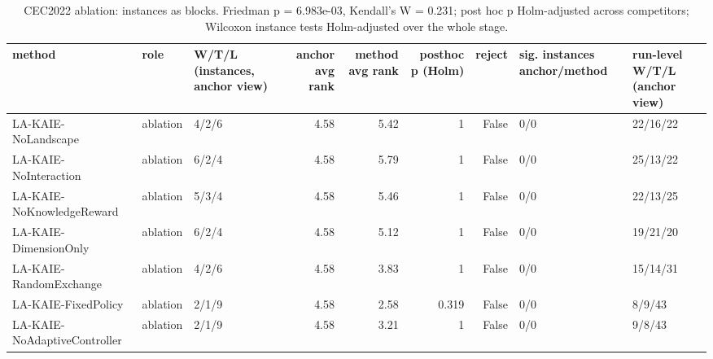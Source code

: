 \begin{table}[t]
\centering
\scriptsize
\caption{CEC2022 ablation: instances as blocks. Friedman p = 6.983e-03, Kendall's W = 0.231; post hoc p Holm-adjusted across competitors; Wilcoxon instance tests Holm-adjusted over the whole stage.}
\label{tab:cec2022_ablation_global}
\begin{tabular}{lllrrrrll}
\toprule
method & role & W/T/L (instances, anchor view) & anchor avg rank & method avg rank & posthoc p (Holm) & reject & sig. instances anchor/method & run-level W/T/L (anchor view) \\
\midrule
LA-KAIE-NoLandscape & ablation & 4/2/6 & 4.58 & 5.42 & 1 & False & 0/0 & 22/16/22 \\
LA-KAIE-NoInteraction & ablation & 6/2/4 & 4.58 & 5.79 & 1 & False & 0/0 & 25/13/22 \\
LA-KAIE-NoKnowledgeReward & ablation & 5/3/4 & 4.58 & 5.46 & 1 & False & 0/0 & 22/13/25 \\
LA-KAIE-DimensionOnly & ablation & 6/2/4 & 4.58 & 5.12 & 1 & False & 0/0 & 19/21/20 \\
LA-KAIE-RandomExchange & ablation & 4/2/6 & 4.58 & 3.83 & 1 & False & 0/0 & 15/14/31 \\
LA-KAIE-FixedPolicy & ablation & 2/1/9 & 4.58 & 2.58 & 0.319 & False & 0/0 & 8/9/43 \\
LA-KAIE-NoAdaptiveController & ablation & 2/1/9 & 4.58 & 3.21 & 1 & False & 0/0 & 9/8/43 \\
\bottomrule
\end{tabular}
\end{table}
